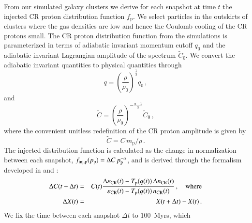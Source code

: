 \documentclass[useAMS,usenatbib]{mn2e}
\def\del#1{{}}
\newcommand{\eps}{\varepsilon}
\newcommand{\p}{\mathrm{p}}
\newcommand{\CR}{\mathrm{CR}}
\begin{document}
\del{From the galaxy cluster simulations
we determine the adiabatic invariant Lagrangian amplitude of the
spectrum $\tilde{C}_0$, where the adiabatic changes of the gas density
$\rho$ change the normalization according to
\begin{equation}
  \label{eq:C0}
  \tilde{C}=\left(\frac{\rho}{\rho_0}\right)^{-\frac{\alpha-1}{3}}\tilde{C}_0\,,
\end{equation}
and the convenient unitless redefinition of the amplitude is given by 
\begin{equation}
  \label{eq:Ct}
  \tilde{C}=C\,m_\p/\rho\,.
\end{equation}}

From our simulated galaxy clusters we derive for each snapshot at time
$t$ the injected CR proton distribution function $f_\p$. We select
particles in the outskirts of clusters where the gas densities are low
and hence the Coulomb cooling of the CR protons small. The CR proton
distribution function from the simulations is parameterized in terms of
adiabatic invariant momentum cutoff $q_0$ and the adiabatic invariant
Lagrangian amplitude of the spectrum $\tilde{C}_0$. We convert the adiabatic invariant quantities to physical quantities through
\begin{equation}
  \label{eq:q0}
  q=\left(\frac{\rho}{\rho_0}\right)^{\frac{1}{3}}q_0\,,
\end{equation}
and
\begin{equation}
  \label{eq:C0}
  \tilde{C}=\left(\frac{\rho}{\rho_0}\right)^{-\frac{\alpha-1}{3}}\tilde{C}_0\,,
\end{equation}
where the convenient unitless redefinition of the CR proton amplitude
is given by
\begin{equation}
  \label{eq:Ct}
  \tilde{C}=C\,m_\p/\rho\,.
\end{equation}
The injected distribution function is calculated as the change in
normalization between each snapshot, $f_\rmn{inj,p}(p_\p) = \Delta
C\,p_\p^{-\alpha}$, and is derived through the formalism developed
in \cite{2007A&A...473...41E} and \cite{2008A&A...481...33J}:
\begin{eqnarray}
  \label{eq:deltaC}
  \Delta C(t+\Delta t) &=& C(t) 
  \frac{\Delta \eps_\CR(t)-T_\p(q(t))\,\Delta n_\CR(t)}
       {\eps_\CR(t) - T_\p(q(t))\,n_\CR(t)}\,,\quad\rmn{where}\nonumber\\
       \Delta X(t) &=&  X(t+\Delta t) -  X(t)\,. 
\end{eqnarray}
We fix the time between each snapshot $\Delta t$ to $100$~Myrs, which
\end{document}
